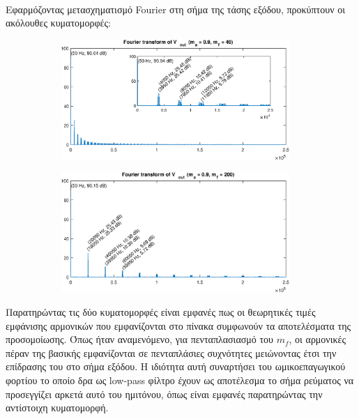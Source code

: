 \noindent\\
Εφαρμόζοντας μετασχηματισμό Fourier στη σήμα της τάσης εξόδου, προκύπτουν οι ακόλουθες κυματομορφές:
\begin{figure}[h!]
	\begin{subfigure}{0.49\textwidth}
		\centering
		\includegraphics[width=0.95\textwidth]{Images/FV_out_40}
	\end{subfigure}
	\begin{subfigure}{0.49\textwidth}
		\centering
		\includegraphics[width=0.95\textwidth]{Images/FV_out_200}
	\end{subfigure}
\end{figure}

\noindent
Παρατηρώντας τις δύο κυματομορφές είναι εμφανές πως οι θεωρητικές τιμές εμφάνισης αρμονικών που εμφανίζονται στο πίνακα συμφωνούν τα αποτελέσματα της προσομοίωσης. Όπως ήταν αναμενόμενο, για πενταπλασιασμό του $m_f$, οι αρμονικές πέραν της βασικής εμφανίζονται σε πενταπλάσιες συχνότητες μειώνοντας έτσι την επίδρασης του στο σήμα εξόδου. Η ιδιότητα αυτή συναρτήσει του ωμικοεπαγωγικού φορτίου το οποίο δρα ως low-pass φίλτρο έχουν ως αποτέλεσμα το σήμα ρεύματος να προσεγγίζει αρκετά αυτό του ημιτόνου, όπως είναι εμφανές παρατηρώντας την αντίστοιχη κυματομορφή. 

